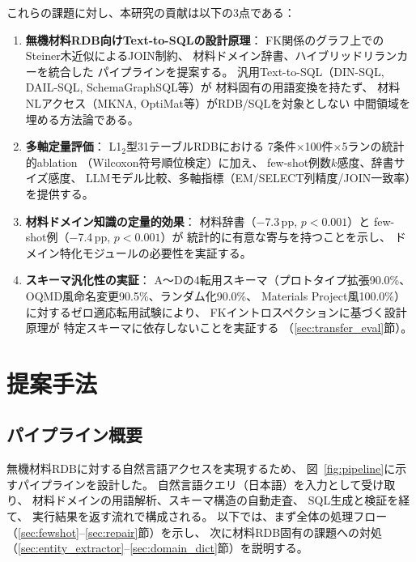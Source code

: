 \documentclass[5p,twocolumn]{elsarticle}
\begin{document}
これらの課題に対し、本研究の貢献は以下の3点である：
\begin{enumerate}[label=(\roman*)]
  \item \textbf{無機材料RDB向けText-to-SQLの設計原理}：
    FK関係のグラフ上でのSteiner木近似によるJOIN制約、
    材料ドメイン辞書、ハイブリッドリランカーを統合した
    パイプラインを提案する。
    汎用Text-to-SQL（DIN-SQL, DAIL-SQL, SchemaGraphSQL等）が
    材料固有の用語変換を持たず、
    材料NLアクセス（MKNA, OptiMat等）がRDB/SQLを対象としない
    中間領域を埋める方法論である。
  \item \textbf{多軸定量評価}：
    L1$_2$型31テーブルRDBにおける
    7条件$\times$100件$\times$5ランの統計的ablation
    （Wilcoxon符号順位検定）に加え、
    few-shot例数$k$感度、辞書サイズ感度、
    LLMモデル比較、多軸指標（EM/SELECT列精度/JOIN一致率）を提供する。
  \item \textbf{材料ドメイン知識の定量的効果}：
    材料辞書（$-$7.3\,pp, $p<0.001$）と
    few-shot例（$-$7.4\,pp, $p<0.001$）が
    統計的に有意な寄与を持つことを示し、
    ドメイン特化モジュールの必要性を実証する。
  \item \textbf{スキーマ汎化性の実証}：
    A〜Dの4転用スキーマ（プロトタイプ拡張90.0\%、
    OQMD風命名変更90.5\%、ランダム化90.0\%、
    Materials Project風100.0\%）に対するゼロ適応転用試験により、
    FKイントロスペクションに基づく設計原理が
    特定スキーマに依存しないことを実証する
    （\ref{sec:transfer_eval}節）。
\end{enumerate}

\section{提案手法}
\label{sec:method}

\subsection{パイプライン概要}

無機材料RDBに対する自然言語アクセスを実現するため、
図~\ref{fig:pipeline}に示すパイプラインを設計した。
自然言語クエリ（日本語）を入力として受け取り、
材料ドメインの用語解析、スキーマ構造の自動走査、
SQL生成と検証を経て、
実行結果を返す流れで構成される。
以下では、まず全体の処理フロー（\ref{sec:fewshot}--\ref{sec:repair}節）を示し、
次に材料RDB固有の課題への対処
（\ref{sec:entity_extractor}--\ref{sec:domain_dict}節）を説明する。
\end{document}
